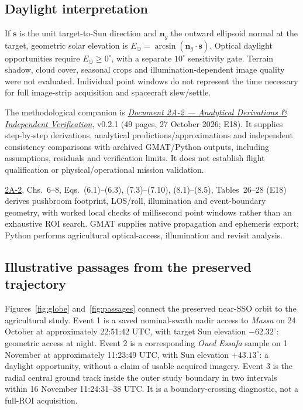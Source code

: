 \documentclass[10pt,a4paper]{article}
\newcommand{\analref}[1]{\href{AtlasSAT_2A-2_Analytical_Derivations_v0.2.1_Public_RC_v0_2.pdf}{2A-2}, #1 (E18)}
\begin{document}
\subsection{Daylight interpretation}
If \(\boldsymbol s\) is the unit target-to-Sun direction and \(\boldsymbol n_g\) the outward ellipsoid normal at the target, geometric solar elevation is \(E_\odot=\arcsin(\boldsymbol n_g\cdot\boldsymbol s)\). Optical daylight opportunities require \(E_\odot\ge0^\circ\), with a separate \(10^\circ\) sensitivity gate. Terrain shadow, cloud cover, seasonal crops and illumination-dependent image quality were not evaluated. Individual point windows do not represent the time necessary for full image-strip acquisition and spacecraft slew/settle.

The methodological companion is \href{AtlasSAT_2A-2_Analytical_Derivations_v0.2.1_Public_RC_v0_2.pdf}{\emph{Document 2A-2 --- Analytical Derivations \& Independent Verification}}, v0.2.1 (49 pages, 27 October 2026; E18). It supplies step-by-step derivations, analytical predictions/approximations and independent consistency comparisons with archived GMAT/Python outputs, including assumptions, residuals and verification limits. It does not establish flight qualification or physical/operational mission validation.

\analref{Chs.~6--8, Eqs.~(6.1)--(6.3), (7.3)--(7.10), (8.1)--(8.5), Tables~26--28} derives pushbroom footprint, LOS/roll, illumination and event-boundary geometry, with worked local checks of millisecond point windows rather than an exhaustive ROI search. GMAT supplies native propagation and ephemeris export; Python performs agricultural optical-access, illumination and revisit analysis.

\subsection{Illustrative passages from the preserved trajectory}
Figures~\ref{fig:globe} and~\ref{fig:passages} connect the preserved near-SSO orbit to the agricultural study. Event 1 is a saved nominal-swath nadir access to \emph{Massa} on 24 October at approximately 22:51:42 UTC, with target Sun elevation $-62.32^\circ$: geometric access at night. Event 2 is a corresponding \emph{Oued Essafa} sample on 1 November at approximately 11:23:49 UTC, with Sun elevation $+43.13^\circ$: a daylight opportunity, without a claim of usable acquired imagery. Event 3 is the radial central ground track inside the outer study boundary in two intervals within 16 November 11:24:31--38 UTC. It is a boundary-crossing diagnostic, not a full-ROI acquisition.
\end{document}
